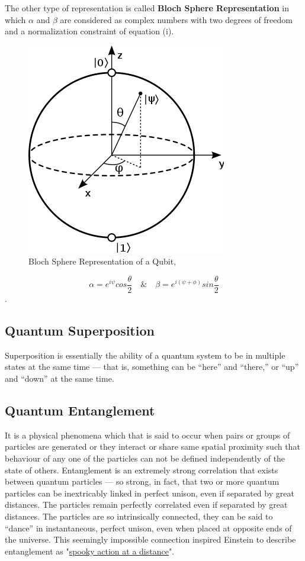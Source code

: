 The other type of representation is called \textbf{Bloch Sphere Representation} in which $\alpha$ and $\beta$ are considered as complex numbers with two degrees of freedom and a normalization constraint of equation (i). 

\begin{figure}[!htb]
\centering
  \includegraphics[scale=0.5]{bloch}
  \caption{Bloch Sphere Representation of a Qubit,}
\end{figure}

\[\alpha =  e^{i\psi}cos\dfrac{\theta}{2} \quad \& \quad \beta = e^{i(\psi + \phi)}sin\dfrac{\theta}{2} \].

\subsection{Quantum Superposition}
Superposition is essentially the ability of a quantum system to be in multiple states at the same time — that is, something can be “here” and “there,” or “up” and “down” at the same time.

\subsection{Quantum Entanglement}
It is a physical phenomena which that is said to occur when pairs or groups of particles are generated or they interact or share same spatial proximity such that behaviour of any one of the particles can not be defined independently of the state of others. Entanglement is an extremely strong correlation that exists between quantum particles — so strong, in fact, that two or more quantum particles can be inextricably linked in perfect unison, even if separated by great distances. The particles remain perfectly correlated even if separated by great distances. The particles are so intrinsically connected, they can be said to “dance” in instantaneous, perfect unison, even when placed at opposite ends of the universe. This seemingly impossible connection inspired Einstein to describe entanglement as "\underline{spooky action at a distance}".


